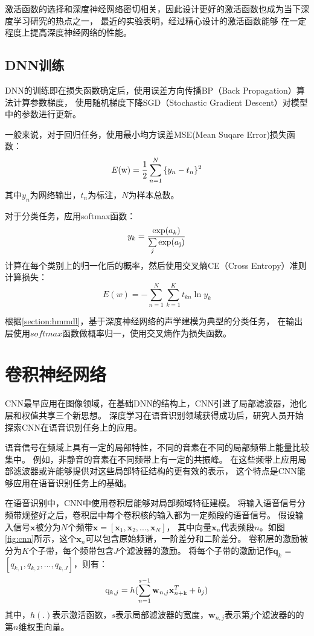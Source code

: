 激活函数的选择和深度神经网络密切相关，因此设计更好的激活函数也成为当下深度学习研究的热点之一，
最近的实验表明，经过精心设计的激活函数能够
在一定程度上提高深度神经网络的性能。

\subsection{DNN训练}

DNN的训练即在损失函数确定后，使用误差方向传播BP（Back Propagation）算法计算参数梯度，
使用随机梯度下降SGD（Stochastic Gradient Descent）对模型中的参数进行更新。

一般来说，对于回归任务，使用最小均方误差MSE(Mean Suqare Error)损失函数：
\begin{equation}
E({\rm{w}}) = \frac{1}{2}\sum\limits_{n = 1}^N {\{ {y_n}}  - {t_n}{\} ^2}
\end{equation}
其中$y_n$为网络输出，$t_n$为标注，$N$为样本总数。

对于分类任务，应用softmax函数：
\begin{equation}
\label{equation:softmax}
{y_k} = \frac{{\exp ({a_k})}}{{\sum\limits_j {\exp ({a_{\rm{j}}})} }}
\end{equation}
计算在每个类别上的归一化后的概率，然后使用交叉熵CE（Cross Entropy）准则计算损失：
\begin{equation}
E(w) =  - \sum\limits_{n = 1}^N {\sum\limits_{k = 1}^K {{t_{kn}}\ln {y_k}} }
\end{equation}

根据\ref{section:hmmdl}，基于深度神经网络的声学建模为典型的分类任务，
在输出层使用$softmax$函数做概率归一，使用交叉熵作为损失函数。

\section{卷积神经网络}

CNN最早应用在图像领域，在基础DNN的结构上，CNN引进了局部滤波器，池化层和权值共享三个新思想。
深度学习在语音识别领域获得成功后，研究人员开始探索CNN在语音识别任务上的应用。

语音信号在频域上具有一定的局部特性，不同的音素在不同的局部频带上能量比较集中。
例如，非静音的音素在不同频带上有一定的共振峰。
在这些频带上应用局部滤波器或许能够提供对这些局部特征结构的更有效的表示，
这个特点是CNN能够应用在语音识别任务上的基础。

在语音识别中，CNN中使用卷积层能够对局部频域特征建模。
将输入语音信号分频带规整好之后，卷积层中每个卷积核的输入都为一定频段的语音信号。
假设输入信号$\textbf{x}$被分为$N$个频带$\textbf{x}= [\textbf{x}_1, \textbf{x}_2, ..., \textbf{x}_N]$，
其中向量$\textbf{x}_n$代表频段$n$。如图\ref{fig:cnn}所示，这个$\textbf{x}_n$可以包含原始频谱，一阶差分和二阶差分。
卷积层的激励被分为$K$个子带，每个频带包含$J$个滤波器的激励。
将每个子带的激励记作$\textbf{q}_k$ = $[q_{k,1}, q_{k,2}, ..., q_{k, J}]$，则有：
\begin{equation}
{{\rm{q}}_{k,j}} = h(\sum\limits_{n = 1}^{s - 1} {{\textbf{w}_{n,j}}\textbf{x}_{n{\rm{ + k}}}^T + {b_j})}
\end{equation}
其中，$h(.)$表示激活函数，$s$表示局部滤波器的宽度，$\textbf{w}_{n,j}$表示第$j$个滤波器的的第$n$维权重向量。



